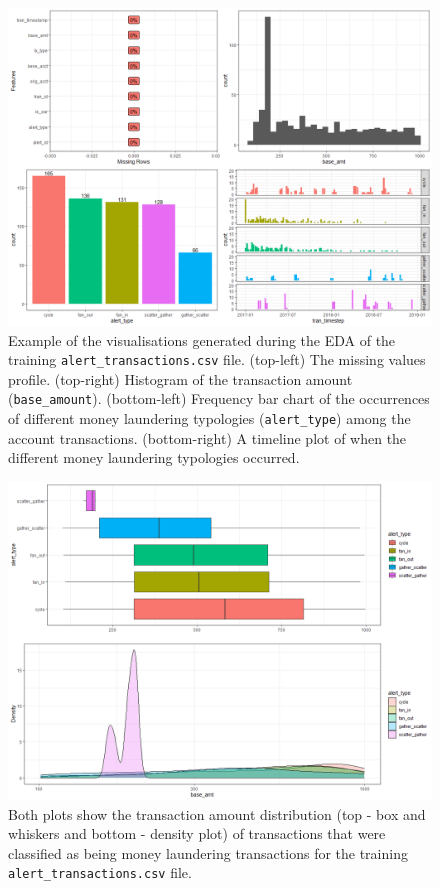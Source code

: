 \begin{figure}
	\begin{center}
		\includegraphics[scale=0.5]{fig/CH3/train_alrt_trans_summary.png}
		\caption{Example of the visualisations generated during the EDA of the training \texttt{alert\_transactions.csv} file. (top-left) The missing values profile. (top-right) Histogram of the transaction amount (\texttt{base\_amount}). (bottom-left) Frequency bar chart of the occurrences of different money laundering typologies (\texttt{alert\_type}) among the account transactions. (bottom-right) A timeline plot of when the different money laundering typologies occurred.}
		\label{fig:ch3_raw_eda_train_alrt_trans_sum}
	\end{center}	
\end{figure}

\begin{figure}
	\begin{center}
		\includegraphics[scale=0.5]{fig/CH3/train_alrt_trans_tx_amount_alert_type_distribution.png}
		\caption{Both plots show the transaction amount distribution (top - box and whiskers and bottom - density plot) of transactions that were classified as being money laundering transactions for the training \texttt{alert\_transactions.csv} file.}
		\label{fig:ch3_raw_eda_train_alrt_trans_tx_distr}
	\end{center}	
\end{figure}

